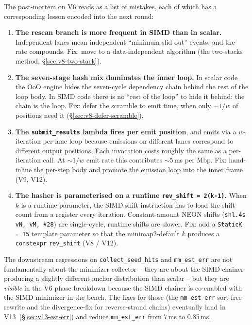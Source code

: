 The post-mortem on V6 reads as a list of mistakes, each of which has
a corresponding lesson encoded into the next round:

\begin{enumerate}
\item \textbf{The rescan branch is more frequent in SIMD than in
  scalar.}  Independent lanes mean independent ``minimum slid out''
  events, and the rate compounds.  Fix: move to a data-independent
  algorithm (the two-stacks method, \S\ref{sec:v8-two-stack}).

\item \textbf{The seven-stage hash mix dominates the inner loop.}
  In scalar code the OoO engine hides the seven-cycle dependency
  chain behind the rest of the loop body.  In SIMD code there is no
  ``rest of the loop'' to hide it behind: the chain is the loop.
  Fix: defer the scramble to emit time, when only $\sim 1/w$ of
  positions need it (\S\ref{sec:v8-defer-scramble}).

\item \textbf{The \texttt{submit\_results} lambda fires per emit
  position}, and emits via a $w$-iteration per-lane loop because
  emissions on different lanes correspond to different output
  positions.  Each invocation costs roughly the same as a
  per-iteration call.  At $\sim 1/w$ emit rate this contributes
  $\sim 5$\,ms per Mbp.  Fix: hand-inline the per-step body and
  promote the emission loop into the inner frame (V9, V12).

\item \textbf{The hasher is parameterised on a runtime
  \texttt{rev\_shift = 2(k-1)}.}  When $k$ is a runtime parameter,
  the SIMD shift instruction has to load the shift count from a
  register every iteration.  Constant-amount NEON shifts (\texttt{shl.4s
  vN, vM, \#28}) are single-cycle, runtime shifts are slower.  Fix:
  add a \texttt{StaticK = 15} template parameter so that the
  minimap2-default $k$ produces a \texttt{constexpr}
  \texttt{rev\_shift} (V8 / V12).
\end{enumerate}

The downstream regressions on \texttt{collect\_seed\_hits} and
\texttt{mm\_est\_err} are not fundamentally about the minimizer
collector -- they are about the SIMD chainer producing a slightly
different anchor distribution than scalar -- but they are
\emph{visible} in the V6 phase breakdown because the SIMD chainer is
co-enabled with the SIMD minimizer in the bench.  The fixes for
those (the \texttt{mm\_est\_err} sort-free rewrite and the
divergence-fix for reverse-strand chains) eventually land in
V13~(\S\ref{sec:v13-est-err}) and reduce \texttt{mm\_est\_err} from
7\,ms to 0.85\,ms.

